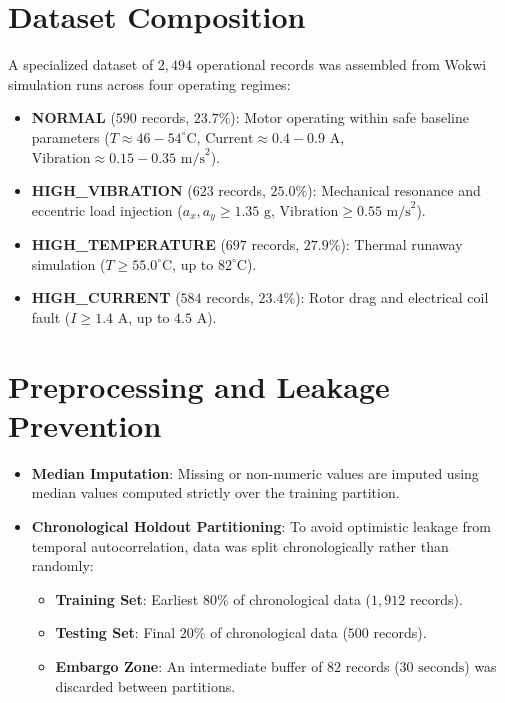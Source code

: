 \documentclass[12pt,a4paper]{report}
\begin{document}
\section{Dataset Composition}
A specialized dataset of $2,494$ operational records was assembled from Wokwi simulation runs across four operating regimes:
\begin{itemize}
    \item \textbf{NORMAL} ($590$ records, $23.7\%$): Motor operating within safe baseline parameters ($T \approx 46 - 54^{\circ}\text{C}$, $\text{Current} \approx 0.4 - 0.9\text{ A}$, $\text{Vibration} \approx 0.15 - 0.35\text{ m/s}^2$).
    \item \textbf{HIGH\_VIBRATION} ($623$ records, $25.0\%$): Mechanical resonance and eccentric load injection ($a_x, a_y \ge 1.35\text{ g}$, $\text{Vibration} \ge 0.55\text{ m/s}^2$).
    \item \textbf{HIGH\_TEMPERATURE} ($697$ records, $27.9\%$): Thermal runaway simulation ($T \ge 55.0^{\circ}\text{C}$, up to $82^{\circ}\text{C}$).
    \item \textbf{HIGH\_CURRENT} ($584$ records, $23.4\%$): Rotor drag and electrical coil fault ($I \ge 1.4\text{ A}$, up to $4.5\text{ A}$).
\end{itemize}

\section{Preprocessing and Leakage Prevention}
\begin{itemize}
    \item \textbf{Median Imputation}: Missing or non-numeric values are imputed using median values computed strictly over the training partition.
    \item \textbf{Chronological Holdout Partitioning}: To avoid optimistic leakage from temporal autocorrelation, data was split chronologically rather than randomly:
    \begin{itemize}
        \item \textbf{Training Set}: Earliest $80\%$ of chronological data ($1,912$ records).
        \item \textbf{Testing Set}: Final $20\%$ of chronological data ($500$ records).
        \item \textbf{Embargo Zone}: An intermediate buffer of $82$ records ($30\text{ seconds}$) was discarded between partitions.
    \end{itemize}
\end{itemize}
\end{document}
